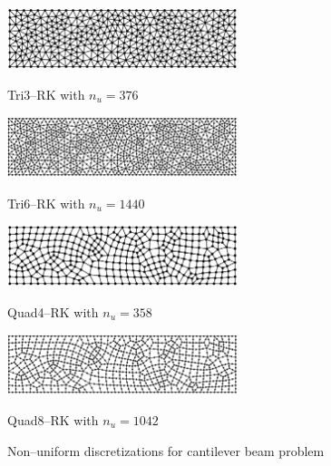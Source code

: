 \begin{figure}[H]
\centering
\begin{subcaptiongroup}
\parbox[b]{0.6\textwidth}{
    \includegraphics[width=0.6\textwidth]{cantilever_tri3_irregular_385.png}
    \caption{Tri3--RK with $n_u=376$}
}
\parbox[b]{0.6\textwidth}{
    \includegraphics[width=0.6\textwidth]{cantilever_tri6_irregular_1457.png}
    \caption{Tri6--RK with $n_u=1440$}
}
\parbox[b]{0.6\textwidth}{
    \includegraphics[width=0.6\textwidth]{cantilever_quad4_irregular_367.png}
    \caption{Quad4--RK with $n_u=358$}
}
\parbox[b]{0.6\textwidth}{
    \includegraphics[width=0.6\textwidth]{cantilever_quad8_irregular_1059.png}
    \caption{Quad8--RK with $n_u=1042$}
}
\end{subcaptiongroup}
\caption{Non--uniform discretizations for cantilever beam problem}\label{fg:cantilever_irregular_mesh}
\end{figure}

